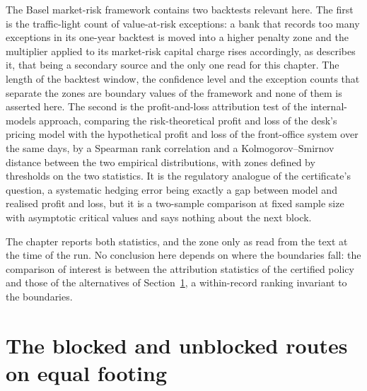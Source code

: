 \documentclass[../../../main.tex]{subfiles}
\begin{document}
The Basel market-risk framework \citep{bcbs2019} contains two backtests relevant here. The first is the traffic-light count of value-at-risk exceptions: a bank that records too many exceptions in its one-year backtest is moved into a higher penalty zone and the multiplier applied to its market-risk capital charge rises accordingly, as \citet[\S1, p.~1]{schmitt2026} describes it, that being a secondary source and the only one read for this chapter. The length of the backtest window, the confidence level and the exception counts that separate the zones are boundary values of the framework and none of them is asserted here. The second is the profit-and-loss attribution test of the internal-models approach, comparing the risk-theoretical profit and loss of the desk's pricing model with the hypothetical profit and loss of the front-office system over the same days, by a Spearman rank correlation and a Kolmogorov--Smirnov distance between the two empirical distributions, with zones defined by thresholds on the two statistics. It is the regulatory analogue of the certificate's question, a systematic hedging error being exactly a gap between model and realised profit and loss, but it is a two-sample comparison at fixed sample size with asymptotic critical values and says nothing about the next block.

The chapter reports both statistics, and the zone only as read from the text at the time of the run. No conclusion here depends on where the boundaries fall: the comparison of interest is between the attribution statistics of the certified policy and those of the alternatives of Section~\ref{sec:usd-routes}, a within-record ranking invariant to the boundaries.


\section{The blocked and unblocked routes on equal footing}\label{sec:usd-routes}
\end{document}
